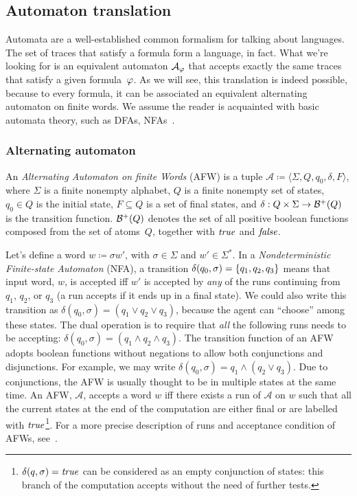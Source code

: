 \subsection{Automaton translation}

Automata are a well-established common formalism for talking about languages.
The set of traces that satisfy a formula form a language, in fact.  What we're
looking for is an equivalent automaton $\mathcal{A}_\varphi$ that accepts
exactly the same traces that satisfy a given \ldl{} formula~$\varphi$.  As we
will see, this translation is indeed possible, because to every \ldl{}
formula, it can be associated an equivalent alternating automaton on finite
words.  We assume the reader is acquainted with basic automata theory, such as
DFAs, NFAs~\cite{bib:languages-book}.


\subsubsection{Alternating automaton}

\begin{definition}
	An \emph{Alternating Automaton on finite Words}
	(AFW) is a tuple
	$\mathcal{A} \coloneqq \langle \Sigma, Q, q_0, \delta, F \rangle$, where
	$\Sigma$ is a finite nonempty alphabet, $Q$ is a finite nonempty set of
	states, $q_0 \in Q$ is the initial state, $F \subseteq Q$ is a set of final
	states, and ${\delta: Q \times \Sigma \to \mathcal{B}^+(Q)}$ is the
	transition function.  $\mathcal{B}^+(Q)$ denotes the set of all positive
	boolean functions composed from the set of atoms~$Q$, together with $\text{\textit{true}}$
	and $\text{\textit{false}}$.
\end{definition}

Let's define a word $w \coloneqq \sigma w'$, with $\sigma \in \Sigma$ and $w'
\in \Sigma^*$.  In a \emph{Nondeterministic Finite-state Automaton}
(NFA), a transition
$\delta(q_0, \sigma) = \{q_1, q_2, q_3\}$ means that input word, $w$, is
accepted iff $w'$ is accepted by \emph{any} of the runs continuing from $q_1$,
$q_2$, or $q_3$ (a run accepts if it ends up in a final state).  We could also
write this transition as $\delta(q_0, \sigma) = (q_1 \lor q_2 \lor q_3)$,
because the agent can ``choose'' among these states. The dual operation is to
require that \emph{all} the following runs needs to be accepting: $\delta(q_0,
\sigma) = (q_1 \land q_2 \land q_3)$. The transition function of an AFW adopts
boolean functions without negations to allow both conjunctions and
disjunctions. For example, we may write $\delta(q_0, \sigma) = q_1 \land (q_2
\lor q_3)$. Due to conjunctions, the AFW is usually thought to be in multiple
states at the same time. An AFW, $\mathcal{A}$, accepts a word $w$ iff there
exists a run of $\mathcal{A}$ on $w$ such that all the current states at the
end of the computation are either final or are labelled with
$\text{\textit{true}}$\footnote{$\delta(q, \sigma) = \text{\textit{true}}$ can be considered as an empty
conjunction of states: this branch of the computation accepts without the need
of further tests.}. For a more precise description of runs and acceptance
condition of AFWs, see~\cite{bib:temp-logic-automata}.

